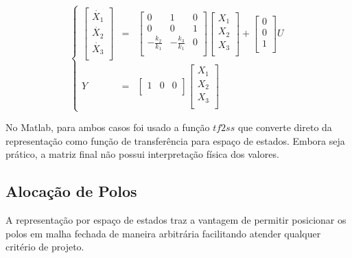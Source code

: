 \documentclass[a4paper,11pt]{article}
\begin{document}
\begin{equation}
\left\{
\begin{array}{rcl}
\left[\begin{array}{c}
    \dot{X_1} \\
    \dot{X_2} \\
    \dot{X_3} \\
\end{array}
\right]
&
=
&
\left[
\begin{array}{ccc}
    0 & 1 & 0 \\
    0 & 0 & 1 \\
    -\frac{k_2}{k_1} & -\frac{k_3}{k_1} & 0 \\ 
\end{array}
\right]
\left[\begin{array}{c}
    X_1 \\
    X_2 \\
    X_3 \\
\end{array}
\right]
+
\left[\begin{array}{c}
    0 \\
    0 \\
    1 \\
\end{array}
\right]
U\\
Y & = &\left[
\begin{array}{ccc}
    1 & 0 & 0 \\
\end{array}
\right]
\left[\begin{array}{c}
    X_1 \\
    X_2 \\
    X_3 \\
\end{array}
\right]
\end{array}
\right.
\end{equation}

No Matlab, para ambos casos foi usado a função $tf2ss$ que converte direto da representação como função de transferência para espaço de estados. Embora seja prático, a matriz final não possui interpretação física dos valores.

\subsection{Alocação de Polos}

A representação por espaço de estados traz a vantagem de permitir posicionar os polos em malha fechada de maneira arbitrária facilitando atender qualquer critério de projeto.
\end{document}
